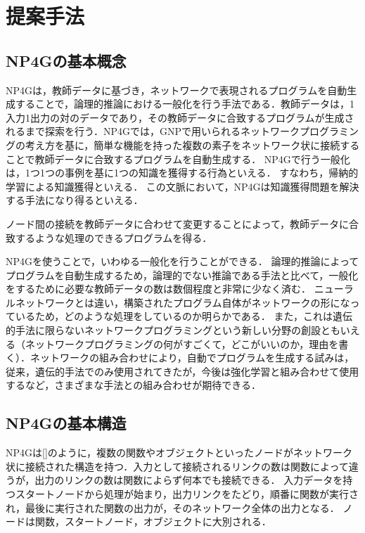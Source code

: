 \documentclass[exploratorypaper]{jsaiart} %
\begin{document}
\section{提案手法}
\subsection{NP4Gの基本概念}
NP4Gは，教師データに基づき，ネットワークで表現されるプログラムを自動生成することで，論理的推論における一般化を行う手法である．教師データは，1入力1出力の対のデータであり，その教師データに合致するプログラムが生成されるまで探索を行う．NP4Gでは，GNPで用いられるネットワークプログラミングの考え方を基に，簡単な機能を持った複数の素子をネットワーク状に接続することで教師データに合致するプログラムを自動生成する．
NP4Gで行う一般化は，1つ1つの事例を基に1つの知識を獲得する行為といえる．
すなわち，帰納的学習による知識獲得といえる．
この文脈において，NP4Gは知識獲得問題を解決する手法になり得るといえる．

ノード間の接続を教師データに合わせて変更することによって，教師データに合致するような処理のできるプログラムを得る．

NP4Gを使うことで，いわゆる一般化を行うことができる．
論理的推論によってプログラムを自動生成するため，論理的でない推論である手法と比べて，一般化をするために必要な教師データの数は数個程度と非常に少なく済む．
ニューラルネットワークとは違い，構築されたプログラム自体がネットワークの形になっているため，どのような処理をしているのか明らかである．
また，これは遺伝的手法に限らないネットワークプログラミングという新しい分野の創設ともいえる（ネットワークプログラミングの何がすごくて，どこがいいのか，理由を書く）．ネットワークの組み合わせにより，自動でプログラムを生成する試みは，従来，遺伝的手法でのみ使用されてきたが，今後は強化学習と組み合わせて使用するなど，さまざまな手法との組み合わせが期待できる．

\subsection{NP4Gの基本構造}
NP4Gは[]のように，複数の関数やオブジェクトといったノードがネットワーク状に接続された構造を持つ．入力として接続されるリンクの数は関数によって違うが，出力のリンクの数は関数によらず何本でも接続できる．
入力データを持つスタートノードから処理が始まり，出力リンクをたどり，順番に関数が実行され，最後に実行された関数の出力が，そのネットワーク全体の出力となる．
ノードは関数，スタートノード，オブジェクトに大別される．
\end{document}
